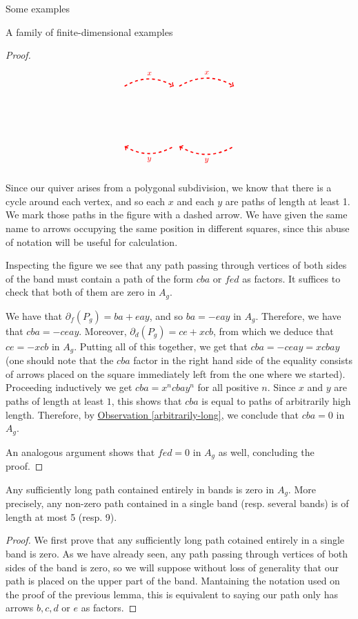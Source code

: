 \begin{chapter}{Some examples}
\begin{section}{A family of finite-dimensional examples}
\begin{proof}
\[\begin{tikzpicture}[text width=1.5mm, font=\footnotesize]
\draw[->, red, dashed, very thick] (-1.9, 2.1) to [bend left] node[above]{$x$} (-0.1, 2.1);
\draw[->, red, dashed, very thick] (0.1, 2.1) to [bend left] node[above]{$x$} (2.1, 2.1);
\draw[<-, red, dashed, very thick] (-1.9, -0.1) to [bend right] node[below]{$y$} (-0.1, -0.1);
\draw[<-, red, dashed, very thick] (0.1, -0.1) to [bend right] node[below]{$y$} (2.1, -0.1);
\end{tikzpicture}
\]

Since our quiver arises from a polygonal subdivision, we know that there is a cycle around each vertex, and so each $x$ and each $y$ are paths of length at least 1. We mark those paths in the figure with a dashed arrow. We have given the same name to arrows occupying the same position in different squares, since this abuse of notation will be useful for calculation.

Inspecting the figure we see that any path passing through vertices of both sides of the band must contain a path of the form $cba$ or $fed$ as factors. It suffices to check that both of them are zero in $A_g$.

We have that $\partial_f(P_g) = ba + eay$, and so $ba  = -eay$ in $A_g$. Therefore, we have that $cba = -ceay$. Moreover, $\partial_d(P_g) = ce + xcb$, from which we deduce that $ce = -xcb$ in $A_g$. Putting all of this together, we get that $cba=-ceay=xcbay$ (one should note that the $cba$ factor in the right hand side of the equality consists of arrows placed on the square immediately left from the one where we started). Proceeding inductively we get $cba=x^ncbay^n$ for all positive $n$. Since $x$ and $y$ are paths of length at least $1$, this shows that $cba$ is equal to paths of arbitrarily high length. Therefore, by \hyperref[arbitrarily-long]{Observation \ref*{arbitrarily-long}}, we conclude that $cba=0$ in $A_g$.

An analogous argument shows that $fed=0$ in $A_g$ as well, concluding the proof. 
\end{proof}

\begin{lemma}\label{long-band-paths} Any sufficiently long path contained entirely in bands is zero in $A_g$. More precisely, any non-zero path contained in a single band (resp. several bands) is of length at most 5 (resp. 9).
\end{lemma}
\begin{proof} We first prove that any sufficiently long path cotained entirely in a single band is zero. As we have already seen, any path passing through vertices of both sides of the band is zero, so we will suppose without loss of generality that our path is placed on the upper part of the band. Mantaining the notation used on the proof of the previous lemma, this is equivalent to saying our path only has arrows $b, c, d$ or $e$ as factors.


\end{proof}
\end{section}
\end{chapter}
